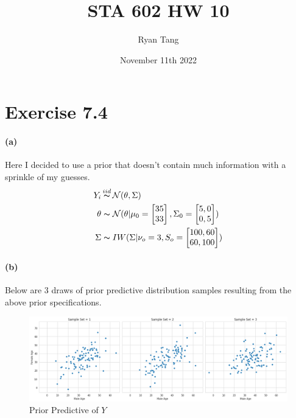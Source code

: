 \documentclass[11pt, letterpaper]{article}
\author{Ryan Tang}
\title{STA 602 HW 10}
\date{November 11th 2022}
\begin{document}
\maketitle

\section{Exercise 7.4}
\paragraph{(a)}
Here I decided to use a prior that doesn't contain much information with a sprinkle of my guesses.
\begin{align*}
    Y_i &\mathop{\thicksim}^{iid} \mathcal{N}(\theta, \Sigma) \\
    \theta &\thicksim \mathcal{N}(\theta|
        \mu_0=\begin{bmatrix}35\\33\end{bmatrix},
        \Sigma_0=\begin{bmatrix}5,0\\0,5\end{bmatrix}
    ) \\
    \Sigma &\thicksim IW(\Sigma|\nu_o = 3, S_o =\begin{bmatrix}100,60\\60,100\end{bmatrix})
\end{align*}

\paragraph{(b)}
Below are 3 draws of prior predictive distribution samples resulting from the above prior specifications.
\begin{figure}[!h]
  \centering
  \includegraphics[width=1.0\textwidth]{1.a.png}
  \captionsetup{justification=centering}
  \caption{Prior Predictive of $Y$}
\end{figure}
\end{document}
